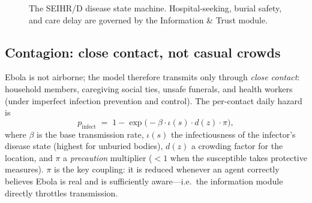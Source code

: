 \documentclass[11pt]{article}
\begin{document}
\begin{figure}[h]
\centering
{}
\caption{The SEIHR/D disease state machine. Hospital-seeking, burial safety, and care delay are governed by the Information \& Trust module.}
\label{fig:seihrd}
\end{figure}

\subsection{Contagion: close contact, not casual crowds}
Ebola is not airborne; the model therefore transmits only through \emph{close contact}: household members, caregiving social ties, unsafe funerals, and health workers (under imperfect infection prevention and control). The per-contact daily hazard is
\[
p_{\text{infect}} \;=\; 1-\exp\!\big(-\beta \cdot \iota(s) \cdot d(z) \cdot \pi\big),
\]
where $\beta$ is the base transmission rate, $\iota(s)$ the infectiousness of the infector's disease state (highest for unburied bodies), $d(z)$ a crowding factor for the location, and $\pi$ a \emph{precaution} multiplier ($<1$ when the susceptible takes protective measures). $\pi$ is the key coupling: it is reduced whenever an agent correctly believes Ebola is real and is sufficiently aware---i.e.\ the information module directly throttles transmission.
\end{document}
